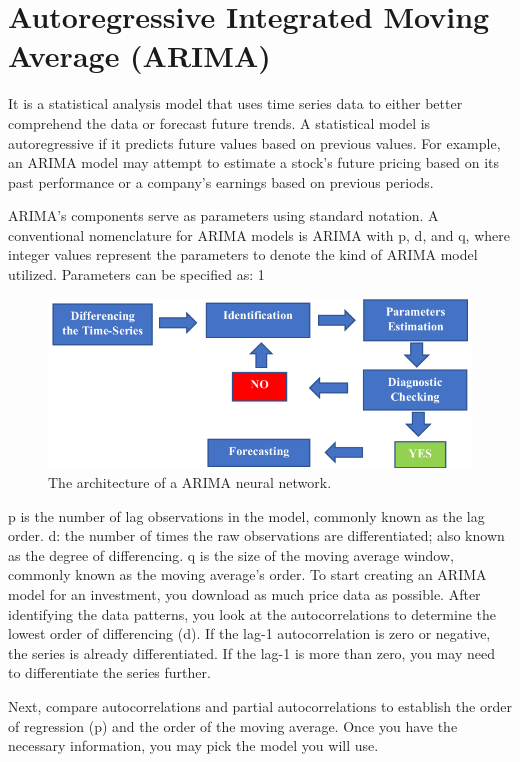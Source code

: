 \section{Autoregressive Integrated Moving Average (ARIMA)}

It is a statistical analysis model that uses time series data to either better comprehend the data or forecast future trends. A statistical model is autoregressive if it predicts future values based on previous values. For example, an ARIMA model may attempt to estimate a stock's future pricing based on its past performance or a company's earnings based on previous periods.

ARIMA's components serve as parameters using standard notation. A conventional nomenclature for ARIMA models is ARIMA with p, d, and q, where integer values represent the parameters to denote the kind of ARIMA model utilized. Parameters can be specified as: 1
\begin{figure}[ht]
    \centering
    \includegraphics[scale=0.5]{figures/Arima.png}
    \caption{The architecture of a ARIMA neural network.}
    \label{fig:chart_a}
\end{figure}

p is the number of lag observations in the model, commonly known as the lag order.
d: the number of times the raw observations are differentiated; also known as the degree of differencing.
q is the size of the moving average window, commonly known as the moving average's order.
To start creating an ARIMA model for an investment, you download as much price data as possible. After identifying the data patterns, you look at the autocorrelations to determine the lowest order of differencing (d). If the lag-1 autocorrelation is zero or negative, the series is already differentiated. If the lag-1 is more than zero, you may need to differentiate the series further.

Next, compare autocorrelations and partial autocorrelations to establish the order of regression (p) and the order of the moving average. Once you have the necessary information, you may pick the model you will use.

